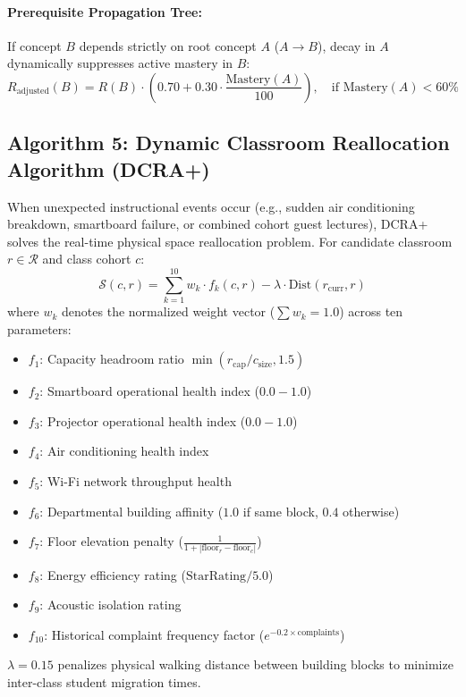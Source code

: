 \documentclass[11pt,a4paper]{article}
\begin{document}
\paragraph{Prerequisite Propagation Tree:} If concept $B$ depends strictly on root concept $A$ ($A \to B$), decay in $A$ dynamically suppresses active mastery in $B$:
\begin{equation}
R_{\text{adjusted}}(B) = R(B) \cdot \left( 0.70 + 0.30 \cdot \frac{\text{Mastery}(A)}{100} \right), \quad \text{if } \text{Mastery}(A) < 60\%
\end{equation}

\subsection{Algorithm 5: Dynamic Classroom Reallocation Algorithm (DCRA+)}
When unexpected instructional events occur (e.g., sudden air conditioning breakdown, smartboard failure, or combined cohort guest lectures), DCRA+ solves the real-time physical space reallocation problem. For candidate classroom $r \in \mathcal{R}$ and class cohort $c$:
\begin{equation}
\mathcal{S}(c, r) = \sum_{k=1}^{10} w_k \cdot f_k(c, r) - \lambda \cdot \text{Dist}(r_{\text{curr}}, r)
\label{eq:dcra}
\end{equation}
where $w_k$ denotes the normalized weight vector ($\sum w_k = 1.0$) across ten parameters:
\begin{itemize}[noitemsep]
    \item $f_1$: Capacity headroom ratio $\min(r_{\text{cap}} / c_{\text{size}}, 1.5)$
    \item $f_2$: Smartboard operational health index ($0.0 - 1.0$)
    \item $f_3$: Projector operational health index ($0.0 - 1.0$)
    \item $f_4$: Air conditioning health index
    \item $f_5$: Wi-Fi network throughput health
    \item $f_6$: Departmental building affinity ($1.0$ if same block, $0.4$ otherwise)
    \item $f_7$: Floor elevation penalty ($\frac{1}{1 + |\text{floor}_r - \text{floor}_c|}$)
    \item $f_8$: Energy efficiency rating ($\text{StarRating} / 5.0$)
    \item $f_9$: Acoustic isolation rating
    \item $f_{10}$: Historical complaint frequency factor ($e^{-0.2 \times \text{complaints}}$)
\end{itemize}
$\lambda = 0.15$ penalizes physical walking distance between building blocks to minimize inter-class student migration times.
\end{document}
